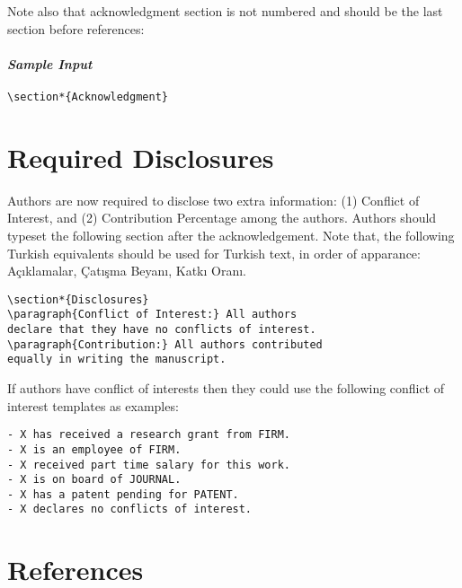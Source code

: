 \documentclass[usenatbib]{tjaa}
\begin{document}
Note also that acknowledgment section is not numbered and should be the last
section before references:
\paragraph*{\itshape Sample Input}
\begin{verbatim}
\section*{Acknowledgment}
\end{verbatim}

\section{Required Disclosures}
Authors are now required to disclose two extra information: (1) Conflict of
Interest, and (2) Contribution Percentage among the authors. Authors should
typeset the following section after the acknowledgement. Note that, the
following Turkish equivalents should be used for Turkish text, in order of
apparance: Açıklamalar, Çatışma Beyanı, Katkı Oranı.
\begin{verbatim}
\section*{Disclosures}
\paragraph{Conflict of Interest:} All authors
declare that they have no conflicts of interest.
\paragraph{Contribution:} All authors contributed
equally in writing the manuscript.
\end{verbatim}

If authors have conflict of interests then they could use the following
conflict of interest templates as examples:
\begin{verbatim}
- X has received a research grant from FIRM. 
- X is an employee of FIRM.
- X received part time salary for this work.
- X is on board of JOURNAL.
- X has a patent pending for PATENT.
- X declares no conflicts of interest.
\end{verbatim}

\section{References}
\label{refer}
\end{document}
